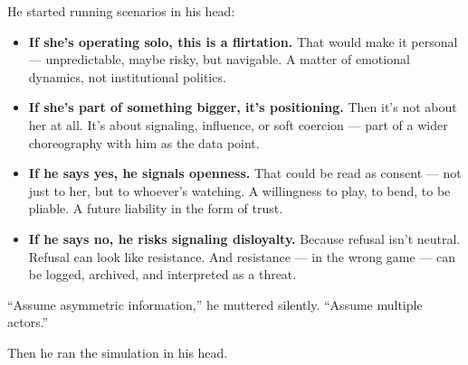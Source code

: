 \medskip

He started running scenarios in his head:

\begin{itemize}
    \item \textbf{If she’s operating solo, this is a flirtation.}
    That would make it personal — unpredictable, maybe risky, but navigable. A matter of emotional dynamics, not institutional politics.

    \item \textbf{If she’s part of something bigger, it’s positioning.} 
    Then it’s not about her at all. It’s about signaling, influence, or soft coercion — part of a wider choreography with him as the data point.

    \item \textbf{If he says yes, he signals openness.} 
    That could be read as consent — not just to her, but to whoever’s watching. A willingness to play, to bend, to be pliable. A future liability in the form of trust.

    \item \textbf{If he says no, he risks signaling disloyalty.} 
    Because refusal isn’t neutral. Refusal can look like resistance. And resistance — in the wrong game — can be logged, archived, and interpreted as a threat.
\end{itemize}


``Assume asymmetric information,'' he muttered silently. ``Assume multiple actors.''

Then he ran the simulation in his head.

